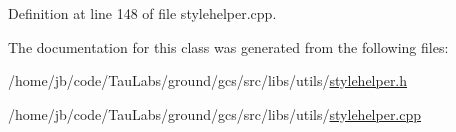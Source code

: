 \-Definition at line 148 of file stylehelper.\-cpp.



\-The documentation for this class was generated from the following files\-:\begin{DoxyCompactItemize}
\item 
/home/jb/code/\-Tau\-Labs/ground/gcs/src/libs/utils/\hyperlink{stylehelper_8h}{stylehelper.\-h}\item 
/home/jb/code/\-Tau\-Labs/ground/gcs/src/libs/utils/\hyperlink{stylehelper_8cpp}{stylehelper.\-cpp}\end{DoxyCompactItemize}
